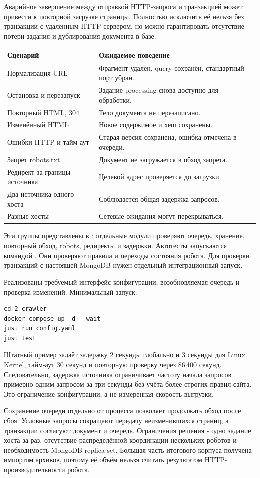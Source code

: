 Аварийное завершение между отправкой HTTP-запроса и транзакцией может
привести к повторной загрузке страницы. Полностью исключить её нельзя без
транзакции с удалённым HTTP-сервером, но можно гарантировать отсутствие
потери задания и дублирования документа в базе.

\testing
\begin{longtable}{p{}p{}}
\toprule Сценарий & Ожидаемое поведение\\\midrule
Нормализация URL & Фрагмент удалён, query сохранён, стандартный порт убран.\\
Остановка и перезапуск & Задание processing снова доступно для обработки.\\
Повторный HTML, 304 & Тело документа не перезаписано.\\
Изменённый HTML & Новое содержимое и хеш сохранены.\\
Ошибки HTTP и тайм-аут & Старая версия сохранена, ошибка отмечена в очереди.\\
Запрет robots.txt & Документ не загружается в обход запрета.\\
Редирект за границы источника & Целевой адрес проверяется до загрузки.\\
Два источника одного хоста & Соблюдается общая задержка запросов.\\
Разные хосты & Сетевые ожидания могут перекрываться.\\\bottomrule
\end{longtable}
Эти группы представлены в : отдельные модули
проверяют очередь, хранение, повторный обход, robots, редиректы и задержки.
Автотесты запускаются командой . Они проверяют
правила и переходы состояния робота. Для проверки транзакций
с настоящей MongoDB нужен отдельный интеграционный запуск.

\results
Реализованы требуемый интерфейс конфигурации, возобновляемая очередь и
проверка изменений. Минимальный запуск:
\begin{lstlisting}
cd 2_crawler
docker compose up -d --wait
just run config.yaml
just test
\end{lstlisting}
Штатный пример задаёт задержку 2 секунды глобально и 3 секунды для Linux
Kernel, тайм-аут 30 секунд и повторную проверку через 86\,400 секунд.
Следовательно, задержка источника ограничивает частоту начала запросов
примерно одним запросом за три секунды без учёта более строгих правил сайта.
Это ограничение конфигурации, а не измеренная скорость выгрузки.

\conclusions
Сохранение очереди отдельно от процесса позволяет продолжать обход после
сбоя. Условные запросы сокращают передачу неизменившихся страниц,
а транзакции согласуют документ и очередь. Ограничения решения -
одно задание хоста за раз, отсутствие распределённой координации нескольких
роботов и необходимость MongoDB replica set. Большая часть итогового корпуса
получена импортом архивов, поэтому её объём нельзя считать результатом
HTTP-производительности робота.
